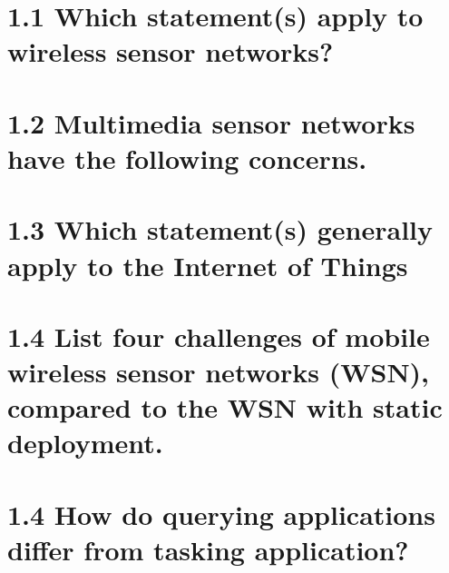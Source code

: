 \documentclass{article}
\begin{document}
	\pagestyle{fancy}
	\hfill
	
	\section*{1.1 Which statement(s) apply to wireless sensor networks?}
	\begin{adjustwidth}{2em}{2em}
	\end{adjustwidth}
	
	\section*{1.2 Multimedia sensor networks have the following concerns.}
	\begin{adjustwidth}{2em}{2em}
	\end{adjustwidth}
	
	\section*{1.3 Which statement(s) generally apply to the Internet of Things}
	\begin{adjustwidth}{2em}{2em}
	\end{adjustwidth}
	
	\section*{1.4 List four challenges of mobile wireless sensor networks (WSN), compared to the WSN with static deployment.}
	\begin{adjustwidth}{2em}{2em}
	\end{adjustwidth}
	
	\section*{1.4 How do querying applications differ from tasking application?}
	\begin{adjustwidth}{2em}{2em}
	\end{adjustwidth}
\end{document}
